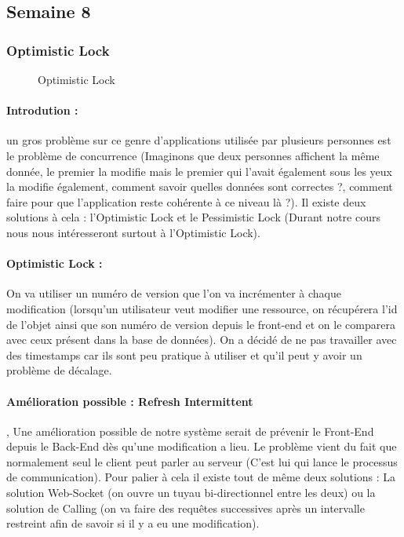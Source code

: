 \documentclass{article}[12pt]
\begin{document}
\subsection{Semaine 8}
\subsubsection{Optimistic Lock}
\begin{figure}[H]
    \centering
    \caption{Optimistic Lock}
\end{figure}

\paragraph{Introdution : } un gros problème sur ce genre d'applications utilisée par plusieurs personnes est le problème de concurrence (Imaginons que deux personnes affichent la même donnée, le premier la modifie mais le premier qui l'avait également sous les yeux la modifie également, comment savoir quelles données sont correctes ?, comment faire pour que l'application reste cohérente à ce niveau là ?). Il existe deux solutions à cela : l'Optimistic Lock et le Pessimistic Lock (Durant notre cours nous nous intéresseront surtout à l'Optimistic Lock). 
\paragraph{Optimistic Lock : } On va utiliser un numéro de version que l'on va incrémenter à chaque modification (lorsqu'un utilisateur veut modifier une ressource, on récupérera l'id de l'objet ainsi que son numéro de version depuis le front-end et on le comparera avec ceux présent dans la base de données). On a décidé de ne pas travailler avec des timestamps car ils sont peu pratique à utiliser et qu'il peut y avoir un problème de décalage. 
\paragraph{Amélioration possible : Refresh Intermittent}, Une amélioration possible de notre système serait de prévenir le Front-End depuis le Back-End dès qu'une modification a lieu. Le problème vient du fait que normalement seul le client peut parler au serveur (C'est lui qui lance le processus de communication). Pour palier à cela il existe tout de même deux solutions : La solution Web-Socket (on ouvre un tuyau bi-directionnel entre les deux) ou la solution de Calling (on va faire des requêtes successives après un intervalle restreint afin de savoir si il y a eu une modification).
\end{document}
